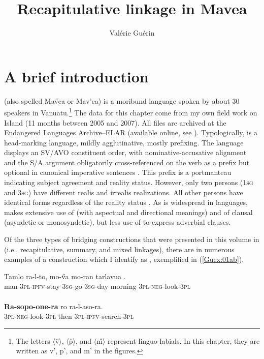 \documentclass[output=paper]{LSP/langsci}
\author{Valérie Guérin\affiliation{James Cook University}}
\title{Recapitulative linkage in Mavea}
\begin{document}
\label{ch:8}

\section{A brief introduction} 
\label{Gusec:Introduction}
 (also spelled Ma\H{v}ea or Mav'ea) is a moribund  language spoken by about 30 speakers in Vanuatu.\footnote{The letters $\langle$\H{v}$\rangle$, $\langle$\H{p}$\rangle$, and $\langle$\H{m}$\rangle$ represent linguo-labials. In this chapter, they are written as v', p', and m' in the figures.} The data for this chapter come from my own field work on  Island (11 months between 2005 and 2007). All files are archived at the Endangered Languages Archive--ELAR (available online, see \citealt{guerin06}). Typologically,  is a head-marking language, mildly agglutinative, mostly prefixing. The language displays an SV\slash AVO constituent order, with nominative-accusative alignment and the S/A argument obligatorily cross-referenced on the verb as a prefix but optional in canonical imperative sentences \citep[][236]{guerin11}. This prefix is a portmanteau indicating subject agreement and reality status. However, only two persons (\textsc{1sg} and \textsc{3sg}) have different realis and irrealis realizations. All other persons have identical forms regardless of the reality status \citep[][61]{guerin11}. As is widespread in  languages,  makes extensive use of  (with aspectual and directional meanings) and of clausal  (asyndetic or monosyndetic), but less use of  to express adverbial clauses. 

Of the three types of bridging constructions that were presented in this volume in  (i.e., recapitulative, summary, and mixed linkages), there are in  numerous examples of a construction which I identify as , exemplified in (\ref{Guex:01ab}). 

\begin{exe}
\ex \label{Guex:01ab}
\begin{xlist}
\ex \label{Guex:01a}
\gll Tamlo   ra-l-to,            mo-\H{v}a    mo-ran      tarlavua  \underline{}.\\
man     \textsc{3pl}-\textsc{ipfv}-stay   \textsc{3sg}-go     \textsc{3sg}-day   morning  \textsc{3pl-neg}-look-\textsc{3pl}\\
\glt {}\\
\ex \label{Guex:01b}
\gll \textbf{Ra-sopo-one-ra} ro      ra-l-aso-ra.\\     	       
    \textsc{3pl-neg}-look-\textsc{3pl}   then  \textsc{3pl-ipfv}-search-\textsc{3pl}\\
\glt {} 
\end{xlist}
\end{exe}
\end{document}
